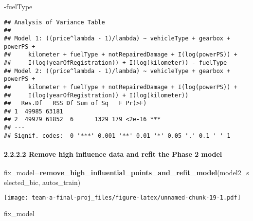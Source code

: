 \documentclass[]{article}
\newenvironment{Shaded}{\begin{snugshade}}{\end{snugshade}}
\newcommand{\DataTypeTok}[1]{\textcolor[rgb]{0.13,0.29,0.53}{#1}}
\newcommand{\DecValTok}[1]{\textcolor[rgb]{0.00,0.00,0.81}{#1}}
\newcommand{\KeywordTok}[1]{\textcolor[rgb]{0.13,0.29,0.53}{\textbf{#1}}}
\newcommand{\NormalTok}[1]{#1}
\newcommand{\OperatorTok}[1]{\textcolor[rgb]{0.81,0.36,0.00}{\textbf{#1}}}
\newcommand{\StringTok}[1]{\textcolor[rgb]{0.31,0.60,0.02}{#1}}
\let\oldparagraph\paragraph
\renewcommand{\paragraph}[1]{\oldparagraph{#1}\mbox{}}
\begin{document}
-fuelType

\begin{Shaded}
\end{Shaded}

\begin{verbatim}
## Analysis of Variance Table
## 
## Model 1: ((price^lambda - 1)/lambda) ~ vehicleType + gearbox + powerPS + 
##     kilometer + fuelType + notRepairedDamage + I(log(powerPS)) + 
##     I(log(yearOfRegistration)) + I(log(kilometer)) - fuelType
## Model 2: ((price^lambda - 1)/lambda) ~ vehicleType + gearbox + powerPS + 
##     kilometer + fuelType + notRepairedDamage + I(log(powerPS)) + 
##     I(log(yearOfRegistration)) + I(log(kilometer))
##   Res.Df   RSS Df Sum of Sq   F Pr(>F)    
## 1  49985 63181                            
## 2  49979 61852  6      1329 179 <2e-16 ***
## ---
## Signif. codes:  0 '***' 0.001 '**' 0.01 '*' 0.05 '.' 0.1 ' ' 1
\end{verbatim}

\hypertarget{remove-high-influence-data-and-refit-the-phase-2-model}{%
\paragraph{2.2.2.2 Remove high influence data and refit the Phase 2
model}\label{remove-high-influence-data-and-refit-the-phase-2-model}}

\begin{Shaded}
\begin{Highlighting}[]
\NormalTok{fix_model=}\KeywordTok{remove_high_influential_points_and_refit_model}\NormalTok{(model2_selected_bic, autos_train)}
\end{Highlighting}
\end{Shaded}

\texttt{[image: team-a-final-proj\_files/figure-latex/unnamed-chunk-19-1.pdf]}

\begin{Shaded}
\begin{Highlighting}[]
\NormalTok{fix_model}
\end{Highlighting}
\end{Shaded}
\end{document}
